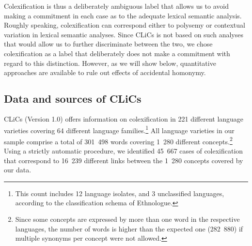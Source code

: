 Colexification is thus a deliberately ambiguous label that allows us to avoid making a commitment in
each case as to the adequate lexical semantic analysis.
Roughly speaking,
colexification can correspond either to polysemy or contextual variation in lexical semantic analyses.
Since CLiCs is not based on such analyses that would allow us to further discriminate between the
two, we chose colexification as a label that deliberately does not make a commitment with regard to
this distinction. However, as we will show below, quantitative approaches are available to rule out effects of accidental homonymy. 

\subsection{Data and sources of CLiCs}
CLiCs (Version 1.0) offers information on colexification in 221 different language varieties
covering 64 different language families.\footnote{This count includes 12 language isolates, and 3
unclassified languages, according to the classification schema of Ethnologue.} All language varieties in our sample comprise a total of
301~498 words covering 1~280 different concepts.\footnote{Since some concepts are expressed by more
than one word in the respective languages, the number of words is higher than the expected one
(282~880) if
multiple synonyms per concept were not allowed.} Using a strictly automatic procedure, we identified
45~667 cases of colexification that correspond to 16~239 different links between the 1~280 concepts
covered by our data. 

